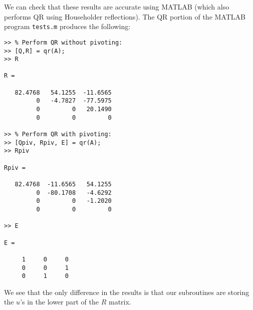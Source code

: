 \documentclass{article}
\begin{document}
We can check that these results are accurate using MATLAB (which also
performs QR using Householder reflections).  The QR portion of the
MATLAB program {\tt tests.m} produces the following:
\begin{verbatim}
>> % Perform QR without pivoting:
>> [Q,R] = qr(A);
>> R
 
R =
 
   82.4768   54.1255  -11.6565
         0   -4.7827  -77.5975
         0         0   20.1490
         0         0         0
 
>> % Perform QR with pivoting:
>> [Qpiv, Rpiv, E] = qr(A);
>> Rpiv
 
Rpiv =
 
   82.4768  -11.6565   54.1255
         0  -80.1708   -4.6292
         0         0   -1.2020
         0         0         0
 
>> E
 
E =
 
     1     0     0
     0     0     1
     0     1     0
\end{verbatim}
We see that the only difference in the results is that our subroutines
are storing the $u$'s in the lower part of the $R$ matrix.
\end{document}
